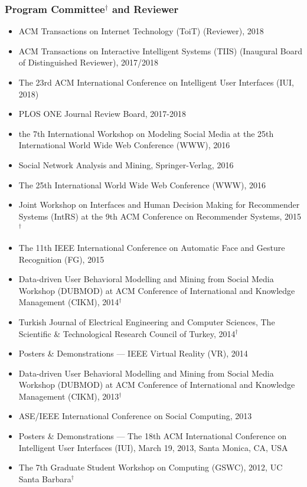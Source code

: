 \documentclass[10pt]{article}
\newenvironment{innerlist}[1][\enskip\textbullet]%
        {\begin{itemize}[#1,leftmargin=*,parsep=0pt,itemsep=0pt,topsep=0pt,partopsep=0pt]}
        {\end{itemize}}
\begin{document}
\subsubsection*{Program Committee$^\dagger$ and Reviewer}
\begin{innerlist}
   \item[--] ACM Transactions on Internet Technology (ToiT) (Reviewer), 2018
   \item[--] ACM Transactions on Interactive Intelligent Systems (TIIS) (Inaugural Board of Distinguished Reviewer), 2017/2018
   \item[--] The 23rd ACM International Conference on Intelligent User Interfaces (IUI, 2018)
   \item[--] PLOS ONE Journal Review Board, 2017-2018
   \item[--] the 7th International Workshop on Modeling Social Media at the 25th International World Wide Web Conference (WWW), 2016
   \item[--] Social Network Analysis and Mining, Springer-Verlag, 2016
   \item[--] The 25th International World Wide Web Conference (WWW), 2016
   \item[--] Joint Workshop on Interfaces and Human Decision Making for Recommender Systems (IntRS) at the 9th ACM Conference on Recommender Systems, 2015$^\dagger$
   \item[--] The 11th IEEE International Conference on Automatic Face and Gesture Recognition (FG), 2015
   \item[--] Data-driven User Behavioral Modelling and Mining from Social Media Workshop (DUBMOD) at ACM Conference of International and Knowledge Management (CIKM), 2014$^\dagger$
   \item[--] Turkish Journal of Electrical Engineering and Computer Sciences, The Scientific \& Technological Research Council of Turkey, 2014$^\dagger$
   \item[--] Posters \& Demonstrations --- IEEE Virtual Reality (VR), 2014
   \item[--] Data-driven User Behavioral Modelling and Mining from Social Media Workshop (DUBMOD) at ACM Conference of International and Knowledge Management (CIKM), 2013$^\dagger$
   \item[--] ASE/IEEE International Conference on Social Computing, 2013
   \item[--] Posters \& Demonstrations --- The 18th ACM International Conference on Intelligent User Interfaces (IUI),
March 19, 2013, Santa Monica, CA, USA
   \item[--] The 7th Graduate Student Workshop on Computing (GSWC), 2012, UC Santa Barbara$^\dagger$
\end{innerlist}
\end{document}
